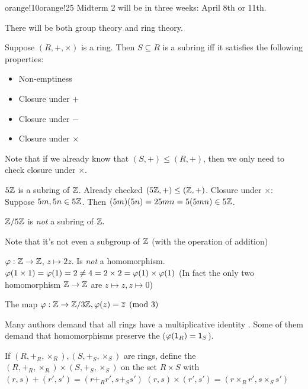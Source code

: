 \documentclass[notes.tex]{subfiles}
\begin{document}
\begin{classnote}{orange!10}{orange!25}
Midterm 2 will be in three weeks: April 8th or 11th.

There will be both group theory and ring theory.
\end{classnote}

\begin{property}
	Suppose $(R, +, \times)$ is a ring. Then $S\subseteq R$ is a subring iff it satisfies the following properties:
	\begin{itemize}
		\item Non-emptiness
		\item Closure under $+$
		\item Closure under $-$
		\item Closure under $\times$
	\end{itemize}
	Note that if we already know that $(S, +) \le (R, +)$, then we only need to check closure under $\times$.
\end{property}

\begin{eg}
	$5\mathbb{Z}$ is a subring of $\mathbb{Z}$.
	Already checked $(5\mathbb{Z}, +) \le (\mathbb{Z}, +)$.
	Closure under $\times$:
	Suppose $5m, 5n\in 5\mathbb{Z}$. Then $(5m)(5n) = 25mn = 5(5mn) \in5\mathbb{Z}$.
\end{eg}
\begin{eg}
	$\mathbb{Z}/5\mathbb{Z}$ is \emph{not} a subring of $\mathbb{Z}.$

	Note that it's not even a subgroup of $\mathbb{Z}$ (with the operation of addition)
\end{eg}

\begin{eg}
	$\varphi:\mathbb{Z}\to\mathbb{Z}$, $z\mapsto2z$. Is \emph{not} a homomorphism.
	$\varphi(1\times 1) =\varphi(1) = 2\ne 4 = 2\times 2 = \varphi(1)\times\varphi(1)$
	(In fact the only two homomorphism $\mathbb{Z}\to\mathbb{Z}$ are $z\mapsto z, z\mapsto 0$)
\end{eg}

\begin{eg}
	The map $\varphi:\mathbb{Z}\to \mathbb{Z}/3\mathbb{Z}, \varphi(z) = \overline{z}\pmod 3$
\end{eg}

\begin{remark}
	Many authors demand that all rings have a multiplicative identity \one. Some of them demand that homomorphisms preserve the \one ($\varphi(\mathsf{1}_R) = \mathsf{1}_S$).
\end{remark}


\begin{defn}
	If $(R, +_R,\times_R), (S, +_S, \times_S)$ are rings, define the  ${(R, +_R,\times_R)\times (S, +_S, \times_S)}$ on the set $R\times S$ with $(r,s) + (r', s') = (r+_Rr', s+_Ss')$ $(r, s)\times (r', s') = (r\times_R r', s\times_S s')$
\end{defn}
\end{document}
